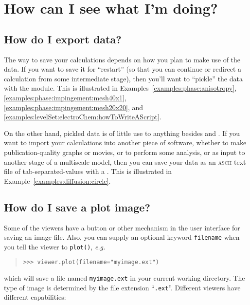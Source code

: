    \section{How can I see what I'm doing?}
    
    \subsection{How do I export data?} The way to save your calculations
    depends on how you plan to make use of the data. If you want to
    save it for ``restart'' (so that you can continue or redirect a
    calculation from some intermediate stage), then you'll want to
    ``pickle'' the \Python{} data with the  module. This
    is illustrated in Examples~\ref{examples:phase:anisotropy},
    \ref{examples:phase:impingement:mesh40x1},
    \ref{examples:phase:impingement:mesh20x20}, and
    \ref{examples:levelSet:electroChem:howToWriteAScript}.
    
    On the other hand, pickled \FiPy{} data is of little use to
    anything besides \Python{} and \FiPy{}. If you want to import your
    calculations into another piece of software, whether to make
    publication-quality graphs or movies, or to perform some analysis,
    or as input to another stage of a multiscale model, then you can
    save your data as an \textsc{ascii} text file of
    tab-separated-values with a . This is 
    illustrated in Example~\ref{examples:diffusion:circle}.
    
    \subsection{How do I save a plot image?} Some of the viewers have a
    button or other mechanism in the user interface for saving an
    image file. Also, you can supply an optional keyword
    \verb+filename+ when you tell the viewer to \verb+plot()+,
    \emph{e.g.}
    \begin{quote}
\begin{verbatim}
>>> viewer.plot(filename="myimage.ext")
\end{verbatim}
    \end{quote}
    which will save a file named \verb+myimage.ext+ in your current
    working directory. The type of image is determined by the file
    extension ``\verb+.ext+''. Different viewers have different
    capabilities: 
    
